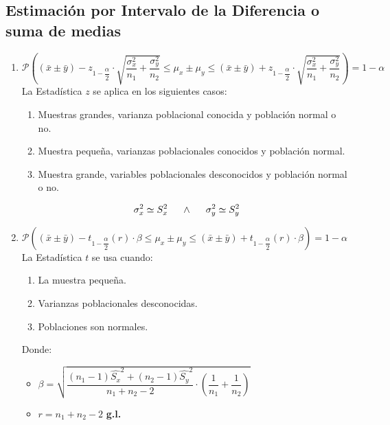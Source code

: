\subsection{Estimación por Intervalo de la Diferencia o suma de medias}
\begin{enumerate}[label=\textbf{(\Roman*)}]
  \item $\mathcal{P}\left( (\bar{x}\pm\bar{y}) - z_{1-\dfrac{\alpha}{2}}\cdot \sqrt{\dfrac{\sigma_{x}^2}{n_1}+\dfrac{\sigma_{y}^2}{n_2}} \leq \mu_x\pm\mu_y \leq (\bar{x}\pm\bar{y}) + z_{1-\dfrac{\alpha}{2}}\cdot \sqrt{\dfrac{\sigma_{x}^2}{n_1}+\dfrac{\sigma_{y}^2}{n_2}} \right)=1-\alpha$ \\${ }$\\
  La Estadística $z$ se aplica en los siguientes casos:
  \begin{enumerate}[label=\textbf{(\roman*)}]
  \item Muestras grandes, varianza poblacional conocida y población normal o no.
  \item Muestra pequeña, varianzas poblacionales conocidos y población normal.
  \item Muestra grande, variables poblacionales desconocidos y población normal o no.
  \end{enumerate}
  $$ \sigma_x^2 \simeq S_x^2 \hspace{0.5cm} \wedge \hspace{0.5cm} \sigma_y^2 \simeq S_y^2 $$
  \item $\mathcal{P}\left( (\bar{x}\pm\bar{y})-t_{1-\dfrac{\alpha
  }{2}}(r)\cdot\beta\leq \mu_x\pm\mu_y \leq (\bar{x}\pm\bar{y})+t_{1-\dfrac{\alpha
  }{2}}(r)\cdot\beta\right)=1-\alpha$\vspace{0.5cm}\\${ }$\\
	La Estadística $t$ se usa cuando:  
  \begin{enumerate}[label=\textbf{(\roman*)}]
  \item La muestra pequeña.
  \item Varianzas poblacionales desconocidas.
  \item Poblaciones son normales.
  \end{enumerate}
  Donde:
  \begin{itemize}
  \item $\beta = \sqrt{\dfrac{(n_1-1)\hat{S_x}^2+(n_2-1)\hat{S_y}^2}{n_1+n_2-2}\cdot\left(\dfrac{1}{n_1}+\dfrac{1}{n_2}\right)}$
  \item $r=n_1+n_2-2$ \textbf{g.l.}
   \end{itemize}
\end{enumerate}
